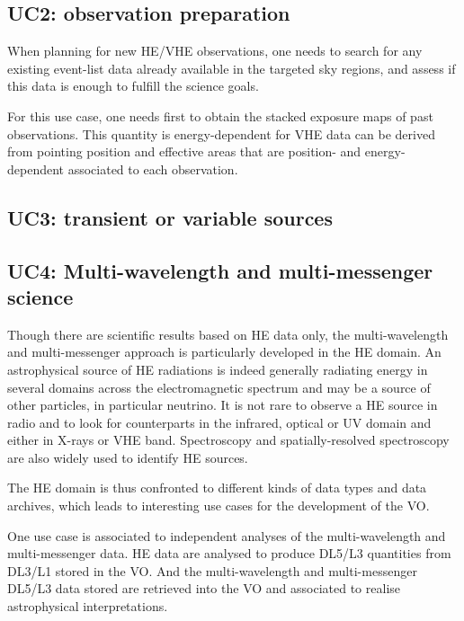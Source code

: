 \documentclass[11pt,a4paper]{ivoa}
\begin{document}
{\subsection{UC2: observation preparation}

When planning for new \gls{HE}/\gls{VHE} observations, one needs to search for any existing event-list data already available in the
targeted sky regions, and assess if this data is enough to fulfill the science goals.

For this use case, one needs first to obtain the stacked exposure maps of past observations. This quantity is
energy-dependent for \gls{VHE} data can be derived from pointing position and effective areas that are position- and energy-
dependent associated to each observation.


\subsection{UC3: transient or variable sources}




\subsection{UC4: Multi-wavelength and multi-messenger science}

Though there are scientific results based on \gls{HE} data only, the multi-wavelength and multi-messenger approach is
particularly developed in the \gls{HE} domain. An astrophysical source of \gls{HE} radiations is indeed generally radiating
energy in several domains across the electromagnetic spectrum and may be a source of other particles, in particular
neutrino. It is not rare to observe a \gls{HE} source in radio and to look for counterparts in the infrared, optical or UV
domain and either in X-rays or \gls{VHE} band. Spectroscopy and spatially-resolved spectroscopy are also widely used to
identify \gls{HE} sources.

The \gls{HE} domain is thus confronted to different kinds of data types and data archives, which leads to interesting use
cases for the development of the \gls{VO}.

One use case is associated to independent analyses of the multi-wavelength and multi-messenger data. \gls{HE} data are
analysed to produce DL5/L3 quantities from DL3/L1 stored in the \gls{VO}. And the multi-wavelength and multi-messenger
DL5/L3 data stored are retrieved into the \gls{VO} and associated to realise astrophysical interpretations.

}
\end{document}
